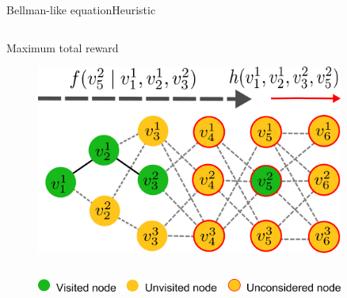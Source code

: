 \begin{frame}{Bellman-like equation}{Heuristic}
\begin{columns}
\begin{block}{Maximum total reward}
\begin{figure}
\centering
\includegraphics[width = 0.9\textwidth]{./figure/DefineFuncP}
\end{figure}
\end{block}
\end{columns}

\begin{figure}
\centering
\includegraphics[width = 0.9\textwidth]{./figure/DefineFuncHelp}
\end{figure}

\end{frame}

